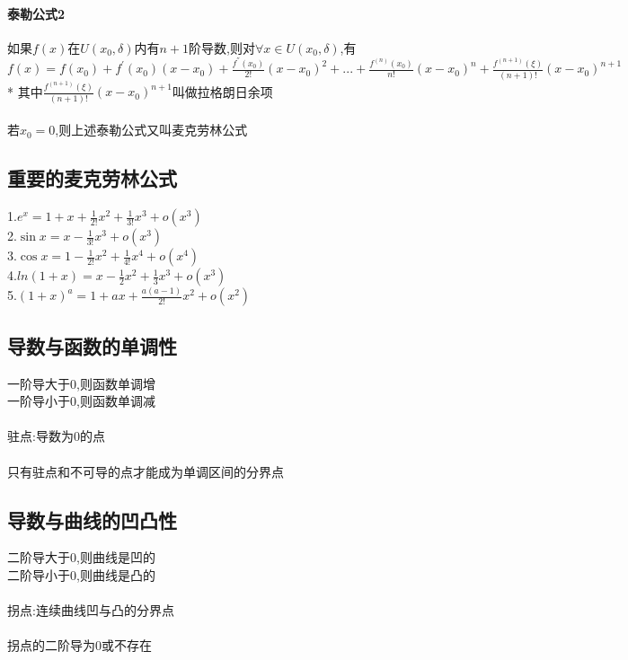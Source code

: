 \documentclass{article}
\begin{document}
\begin{flushleft}
	\paragraph{泰勒公式2}
	如果$f(x)$在$U(x_0,\delta)$内有$n+1$阶导数,则对$\forall x \in U(x_0,\delta)$,有$f(x)=f(x_0)+f^{'}(x_0)(x-x_0)+\frac{f^{''}(x_0)}{2!}(x-x_0)^2+...+\frac{f^{(n)}(x_0)}{n!}(x-x_0)^n+\frac{f^{(n+1)}(\xi)}{(n+1)!}(x-x_0)^{n+1}$\\
	* 其中$\frac{f^{(n+1)}(\xi)}{(n+1)!}(x-x_0)^{n+1}$叫做拉格朗日余项\\
	~\\
	若$x_0=0$,则上述泰勒公式又叫麦克劳林公式\\
	
	\subsection{重要的麦克劳林公式}
	
	1.$e^x=1+x+\frac{1}{2!}x^2+\frac{1}{3!}x^3+o(x^3)$\\
	2.$\sin x=x-\frac{1}{3!}x^3+o(x^3)$\\
	3.$\cos x=1-\frac{1}{2!}x^2+\frac{1}{4!}x^4+o(x^4)$\\
	4.$ln(1+x)=x-\frac{1}{2}x^2+\frac{1}{3}x^3+o(x^3)$\\
	5.$(1+x)^a=1+ax+\frac{a(a-1)}{2!}x^2+o(x^2)$\\
	
	\subsection{导数与函数的单调性}
	
	一阶导大于0,则函数单调增\\
	一阶导小于0,则函数单调减\\
	~\\
	驻点:导数为0的点\\
	~\\
	只有驻点和不可导的点才能成为单调区间的分界点\\
	
	\subsection{导数与曲线的凹凸性}
	
	二阶导大于0,则曲线是凹的\\
	二阶导小于0,则曲线是凸的\\
	~\\
	拐点:连续曲线凹与凸的分界点\\
	~\\
	拐点的二阶导为0或不存在\\
	~\\

\end{flushleft}
\end{document}
